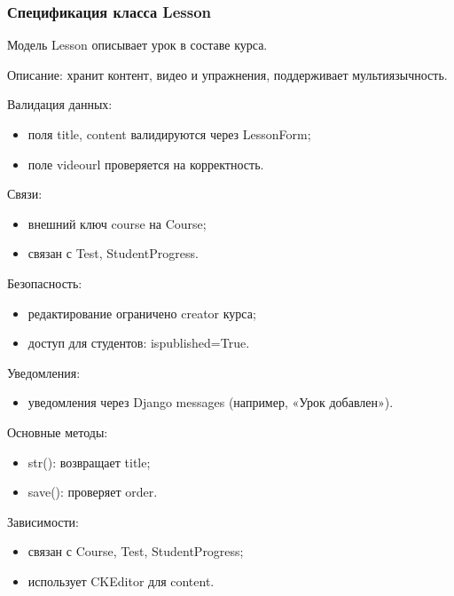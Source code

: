 \subsubsection{Спецификация класса Lesson}

Модель Lesson описывает урок в составе курса.

Описание: хранит контент, видео и упражнения, поддерживает мультиязычность.

Валидация данных:
	\begin{itemize}
		\item поля title, content валидируются через LessonForm;
		\item поле videourl проверяется на корректность.
	\end{itemize}
	
Связи:
	\begin{itemize}
		\item внешний ключ course на Course;
		\item связан с Test, StudentProgress.
	\end{itemize}
	
Безопасность:
	\begin{itemize}
		\item редактирование ограничено creator курса;
		\item доступ для студентов: ispublished=True.
	\end{itemize}
	
Уведомления:
	\begin{itemize}
		\item уведомления через Django messages (например, «Урок добавлен»).
	\end{itemize}
	
Основные методы:
	\begin{itemize}
		\item str(): возвращает title;
		\item save(): проверяет order.
	\end{itemize}
	
Зависимости:
	\begin{itemize}
		\item связан с Course, Test, StudentProgress;
		\item использует CKEditor для content.
	\end{itemize}


